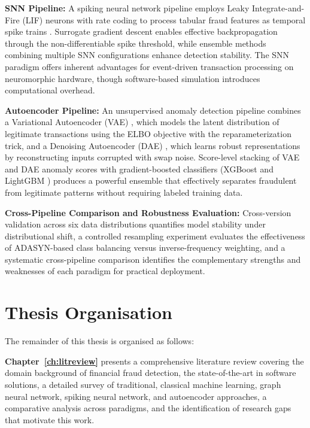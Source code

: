 \textbf{SNN Pipeline:} A spiking neural network pipeline employs Leaky Integrate-and-Fire (LIF) neurons with rate coding to process tabular fraud features as temporal spike trains \cite{nasif2026reinforcement}. Surrogate gradient descent enables effective backpropagation through the non-differentiable spike threshold, while ensemble methods combining multiple SNN configurations enhance detection stability. The SNN paradigm offers inherent advantages for event-driven transaction processing on neuromorphic hardware, though software-based simulation introduces computational overhead.

\textbf{Autoencoder Pipeline:} An unsupervised anomaly detection pipeline combines a Variational Autoencoder (VAE) \cite{kingma2014auto}, which models the latent distribution of legitimate transactions using the ELBO objective with the reparameterization trick, and a Denoising Autoencoder (DAE) \cite{vincent2010stacked}, which learns robust representations by reconstructing inputs corrupted with swap noise. Score-level stacking of VAE and DAE anomaly scores with gradient-boosted classifiers (XGBoost \cite{chen2016xgboost} and LightGBM \cite{ke2017lightgbm}) produces a powerful ensemble that effectively separates fraudulent from legitimate patterns without requiring labeled training data.

\textbf{Cross-Pipeline Comparison and Robustness Evaluation:} Cross-version validation across six data distributions quantifies model stability under distributional shift, a controlled resampling experiment evaluates the effectiveness of ADASYN-based class balancing \cite{he2008adasyn} versus inverse-frequency weighting, and a systematic cross-pipeline comparison identifies the complementary strengths and weaknesses of each paradigm for practical deployment.

\section{Thesis Organisation}

The remainder of this thesis is organised as follows:

\textbf{Chapter~\ref{ch:litreview}} presents a comprehensive literature review covering the domain background of financial fraud detection, the state-of-the-art in software solutions, a detailed survey of traditional, classical machine learning, graph neural network, spiking neural network, and autoencoder approaches, a comparative analysis across paradigms, and the identification of research gaps that motivate this work.

